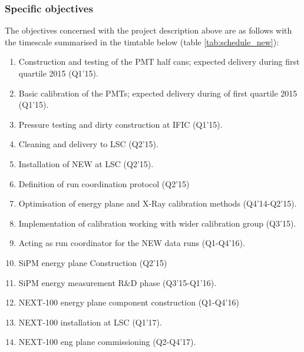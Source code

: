 \documentclass[a4paper,11pt,oneside]{article}
\begin{document}
\subsubsection*{Specific objectives}
The objectives concerned with the project description above are as
follows with the timescale summarised in the timtable below (table \ref{tab:schedule_new}):
\begin{enumerate}
  \item Construction and testing of the PMT half cans; expected
    delivery during first quartile 2015 (Q1'15).
  \item Basic calibration of the PMTs; expected
    delivery during of first quartile 2015 (Q1'15).
  \item Pressure testing and dirty construction at IFIC (Q1'15).
  \item Cleaning and delivery to LSC (Q2'15).
  \item Installation of NEW at LSC (Q2'15).
  \item Definition of run coordination protocol (Q2'15)
  \item Optimisation of energy plane and X-Ray calibration methods
    (Q4'14-Q2'15).
  \item Implementation of calibration working with wider calibration
    group (Q3'15).
  \item Acting as run coordinator for the NEW data runs (Q1-Q4'16).
  \item SiPM energy plane Construction (Q2'15)
  \item SiPM energy measurement R\&D phase (Q3'15-Q1'16).
  \item NEXT-100 energy plane component construction (Q1-Q4'16)
  \item NEXT-100 installation at LSC (Q1'17).
  \item NEXT-100 eng plane commissioning (Q2-Q4'17).
\end{enumerate}
\end{document}

